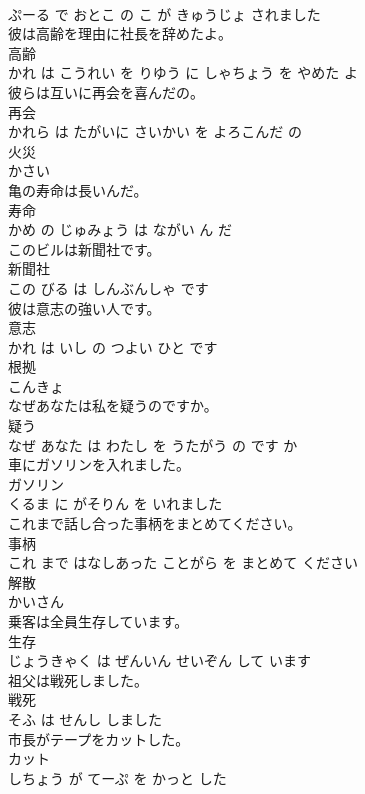 \documentclass[8pt]{extreport}
\begin{document}
\begin{CJK}{UTF8}{min}
\\	ぷーる で おとこ の こ が きゅうじょ されました			
\\	彼は高齢を理由に社長を辞めたよ。	
\\	高齢 
\\	かれ は こうれい を りゆう に しゃちょう を やめた よ			
\\	彼らは互いに再会を喜んだの。	
\\	再会 
\\	かれら は たがいに さいかい を よろこんだ の			
\\	火災	
\\	かさい		
\\	亀の寿命は長いんだ。	
\\	寿命 
\\	かめ の じゅみょう は ながい ん だ			
\\	このビルは新聞社です。	
\\	新聞社 
\\	この びる は しんぶんしゃ です			
\\	彼は意志の強い人です。	
\\	意志 
\\	かれ は いし の つよい ひと です			
\\	根拠	
\\	こんきょ		
\\	なぜあなたは私を疑うのですか。	
\\	疑う 
\\	なぜ あなた は わたし を うたがう の です か			
\\	車にガソリンを入れました。	
\\	ガソリン 
\\	くるま に がそりん を いれました			
\\	これまで話し合った事柄をまとめてください。	
\\	事柄 
\\	これ まで はなしあった ことがら を まとめて ください			
\\	解散	
\\	かいさん		
\\	乗客は全員生存しています。	
\\	生存 
\\	じょうきゃく は ぜんいん せいぞん して います			
\\	祖父は戦死しました。	
\\	戦死 
\\	そふ は せんし しました			
\\	市長がテープをカットした。	
\\	カット 
\\	しちょう が てーぷ を かっと した			

\end{CJK}
\end{document}
